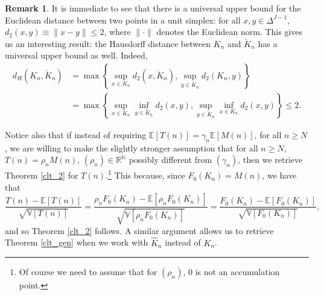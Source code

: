 \documentclass[12pt, reqno]{amsart}
\theoremstyle{definition}
\newtheorem{remark}{Remark}
\begin{document}
 
\begin{remark}
It is immediate to see that there is a universal upper bound for the Euclidean distance between two points in a unit simplex: for all $x,y \in \Delta^{J-1}$, $d_2(x,y) \equiv \|x-y\| \leq 2$, where $\|\cdot\|$ denotes the Euclidean norm. This gives us an interesting result: the Hausdorff distance between $K_n$ and $\breve{K}_n$ has a universal upper bound as well. Indeed,  
\begin{align*}
    d_H({K}_n,\breve{{K}}_n)&=  \max\left\lbrace{ \sup_{{x} \in {K}_n} d_2 (x,\breve{{K}}_n), \sup_{y \in \breve{{K}}_n} d_2({K}_n,y)}\right\rbrace  \\
    &=\max\left\lbrace{ \sup_{{x} \in {K}_n} \inf_{y \in \breve{{K}}_n}d_2 (x,y), \sup_{y \in \breve{{K}}_n} \inf_{x \in {K}_n} d_2(x,y)}\right\rbrace \leq 2.
\end{align*}

Notice also that if instead of requiring $\mathbb{E}[T(n)]=\gamma_n \mathbb{E}[M(n)]$, for all $n\geq N$,   we are willing to make the slightly stronger assumption that for all $n\geq N$, $T(n)=\rho_n  M(n)$, $(\rho_n) \in \mathbb{R}^\mathbb{N}$ possibly different from $(\gamma_n)$, then we retrieve Theorem \ref{clt_2} for $T(n)$.\footnote{Of course we need to assume that for $(\rho_n)$, $0$ is not an accumulation point.} This because, since $F_0(K_n) = M(n)$, we have that 
$$\frac{T(n) -\mathbb{E}[T(n)]}{\sqrt{\mathbb{V}[T(n)]}} = \frac{\rho_n F_0(K_n) - \mathbb{E}[\rho_n F_0(K_n)]}{\sqrt{\mathbb{V}[\rho_n F_0(K_n)]}} = \frac{F_0(K_n) -\mathbb{E}[F_0(K_n)]}{\sqrt{\mathbb{V}[F_0(K_n)]}},$$
and so Theorem \ref{clt_2} follows. A similar argument allows us to retrieve Theorem \ref{clt_gen} when we work with $\hat{K}_n$ instead of ${K}_n$.
\end{remark}


\end{document}
